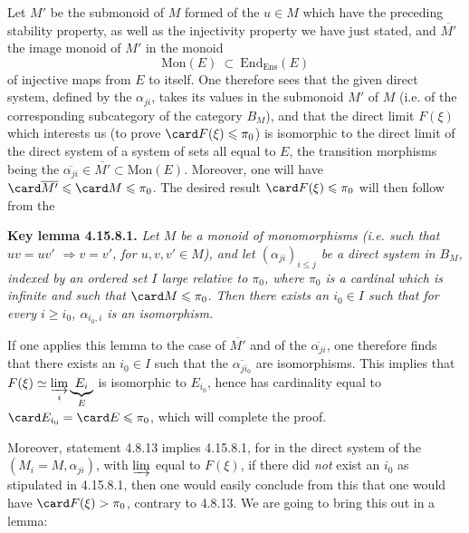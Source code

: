 Let $M'$ be the submonoid of $M$ formed of the $u \in M$ which have the preceding stability property, as well as the injectivity property we have just stated, and $\overline{M'}$ the image monoid of $M'$ in the monoid
\[
\mathrm{Mon}(E) \ \subset \ \mathrm{End}_{\mathrm{Ens}}(E)
\]
of injective maps from $E$ to itself. One therefore sees that the given direct system, defined by the $\alpha_{ji}$, takes its values in the submonoid $M'$ of $M$ (i.e. of the corresponding subcategory of the category $B_M$), and that the direct limit $F(\xi)$ which interests us (to prove $\card F(\xi) \leqslant \pi_0$) is isomorphic to the direct limit of the direct system of a system of sets all equal to $E$, the transition morphisms being the $\overline{\alpha_{ji}} \in \overline{M'} \subset \mathrm{Mon}(E)$. Moreover, one will have $\card \overline{M'} \leqslant \card M \leqslant \pi_0$. The desired result $\card F(\xi) \leqslant \pi_0$ will then follow from the

\textbf{Key lemma 4.15.8.1.} \textit{Let $M$ be a monoid of monomorphisms (i.e. such that $uv = uv'$ $\Longrightarrow v = v'$, for $u,v,v' \in M$), and let $(\alpha_{ji})_{i\leqslant j}$ be a direct system in $B_M$, indexed by an ordered set $I$ large relative to $\pi_0$, where $\pi_0$ is a cardinal}
\textit{which is infinite and such that} $\card M \leqslant \pi_0$. \textit{Then there exists an $i_0 \in I$ such that for every $i \geqslant i_0$, $\alpha_{i_0,i}$ is an isomorphism.}

If one applies this lemma to the case of $\overline{M'}$ and of the $\overline{\alpha_{ji}}$, one therefore finds that there exists an $i_0 \in I$ such that the $\overline{\alpha_{ji_0}}$ are isomorphisms. This implies that $F(\xi) \simeq \varinjlim\limits_{i} \underbrace{E_i}_{E}$ is isomorphic to $E_{i_0}$, hence has cardinality equal to $\card E_{i_0} = \card E \leqslant \pi_0$, which will complete the proof.

Moreover, statement 4.8.13 implies 4.15.8.1, for in the direct system of the $(M_i = M, \alpha_{ji})$, with $\varinjlim$ equal to $F(\xi)$, if there did \textit{not} exist an $i_0$ as stipulated in 4.15.8.1, then one would easily conclude from this that one would have $\card F(\xi) > \pi_0$, contrary to 4.8.13. We are going to bring this out in a lemma:

